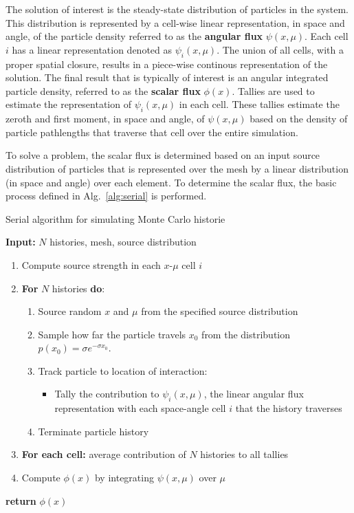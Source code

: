 \documentclass[12pt]{article}
\begin{document}
The solution of interest is the steady-state
distribution of particles in the system. This distribution is represented by
a cell-wise linear representation, in space and angle, of the particle density
referred to as the
\textbf{angular flux} $\psi(x,\mu)$. Each cell $i$ has a linear representation denoted as
$\psi_i(x,\mu)$.  The union of all cells, with a proper
spatial closure, results in a piece-wise continous representation of the solution.  The final result that is typically of interest
is an angular integrated particle density, referred to as the \textbf{scalar flux} 
$\phi(x)$. Tallies are used to estimate the representation of $\psi_i(x,\mu)$ in
each cell.  These tallies estimate the zeroth and first moment, in space and angle,
of $\psi(x,\mu)$ based on the density of particle pathlengths that traverse that cell
over the entire simulation.

To solve a problem, the
scalar flux is determined based on an input source distribution of particles that is represented
over the mesh by a linear distribution (in space and angle) over each element.  To determine
the scalar flux, the basic process defined in 
Alg.~\ref{alg:serial} is performed.  
\begin{algorithm}
    \caption{\label{alg:serial}Serial algorithm for simulating Monte Carlo historie}
    \vspace{0.06in}
    \textbf{Input:} $N$ histories, mesh, source distribution
    \vspace{-0.1in}
    \begin{enumerate}
    \item Compute source strength in each $x$-$\mu$ cell $i$
    \item \textbf{For} {$N$ histories} \textbf{do}:
        \begin{enumerate}
       \item Source random $x$ and $\mu$ from the specified source distribution
    \item Sample how far the particle travels $x_0$ from the distribution $p(x_0) =
        \sigma e^{-\sigma x_0}$.
    \item Track particle to location of interaction:
        \begin{itemize}
            \item Tally the contribution to $\psi_i(x,\mu)$, the
                linear angular flux representation with each space-angle cell $i$
                that the history traverses
        \end{itemize}
    \item Terminate particle history
\end{enumerate}
    \item \textbf{For each cell:} average contribution of $N$ histories to all tallies
    \item Compute $\phi(x)$ by integrating $\psi(x,\mu)$ over $\mu$
\end{enumerate}
\vspace{-0.1in}
     \textbf{return} $\phi(x)$
\end{algorithm}
\end{document}
